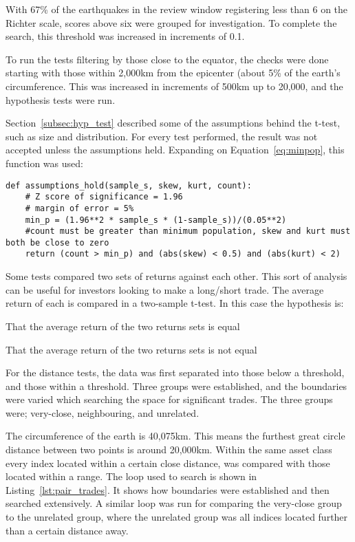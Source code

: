 With 67\% of the earthquakes in the review window registering less than 6 on the Richter scale, scores above six were grouped for investigation. To complete the search, this threshold was increased in increments of 0.1.

To run the tests filtering by those close to the equator, the checks were done starting with those within 2,000km from the epicenter (about 5\% of the earth's circumference. This was increased in increments of 500km up to 20,000, and the hypothesis tests were run.

Section~\ref{subsec:hyp_test} described some of the assumptions behind the t-test, such as size and distribution. For every test performed, the result was not accepted unless the assumptions held. Expanding on Equation~\ref{eq:minpop}, this function was used:

\begin{lstlisting}[caption={Function to test if assumptions hold}, captionpos=t, label={lst:assumpt}]
def assumptions_hold(sample_s, skew, kurt, count):
    # Z score of significance = 1.96
    # margin of error = 5%
    min_p = (1.96**2 * sample_s * (1-sample_s))/(0.05**2)
    #count must be greater than minimum population, skew and kurt must both be close to zero
    return (count > min_p) and (abs(skew) < 0.5) and (abs(kurt) < 2)
\end{lstlisting}

Some tests compared two sets of returns against each other. This sort of analysis can be useful for investors looking to make a long/short trade. The average return of each is compared in a two-sample t-test. In this case the hypothesis is:

\setcounter{hyp}{-1}
\begin{hyp} \label{hyp:null_2}That the average return of the two returns sets is equal \end{hyp}
\begin{hyp} \label{hyp:alt_2}That the average return of the two returns sets is not equal \end{hyp}

For the distance tests, the data was first separated into those below a threshold, and those within a threshold. Three groups were established, and the boundaries were varied which searching the space for significant trades. The three groups were; very-close, neighbouring, and unrelated. 

The circumference of the earth is 40,075km. This means the furthest great circle distance between two points is around 20,000km. Within the same asset class every index located within a certain close distance, was compared with those located within a range. The loop used to search is shown in Listing~\ref{lst:pair_trades}. It shows how boundaries were established and then searched extensively. A similar loop was run for comparing the very-close group to the unrelated group, where the unrelated group was all indices located further than a certain distance away.

